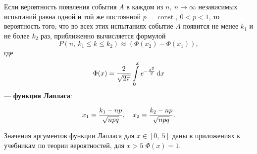 \documentclass[a4paper]{article}
\DeclareMathOperator{\const}{const}
\newcommand{\sleq}{\leqslant}
\newcommand{\sqrtt}[1]{\sqrt{\vphantom{qb} #1}}
\newcommand{\key}[1]{{\bfseries\color{Medium} #1}}
\begin{document}
                        Если вероятность появления события $A$ в каждом из $n, \: n \to \infty$ независимых испытаний равна одной и той же постоянной $p = \const , \: 0 < p < 1$, то вероятность того, что во всех этих испытаниях событие $A$ появится не менее $k_1$ и не более $k_2$ раз, приближенно вычисляется формулой
                        \begin{equation*}
                            P(n, \: k_1 \sleq k \sleq k_2) \approx (\Phi (x_2) - \Phi (x_1)) ,
                        \end{equation*}
                        где
                        \begin{equation*}
                            \Phi (x) = \frac{2}{\sqrtt{2 \pi}}
                                \int\limits_{0}^{x} e^{-\frac{x^\text{\tiny 2}}{2}} \dif x
                        \end{equation*}
                        --- \key{функция Лапласа}:

                        \vspace{2.0ex}


                        \begin{equation*}
                            x_1 = \frac{k_1 - n p}{\sqrtt{n p q}} , \quad
                                x_2 = \frac{k_2 - n p}{\sqrtt{n p q}} .
                        \end{equation*}
                        
                        Значения аргументов функции Лапласа для $x \in [0, \: 5]$ даны в приложениях к учебникам по теории вероятностей, для $x > 5$ \:$\Phi (x) = 1$.

        \newpage
        
\end{document}
